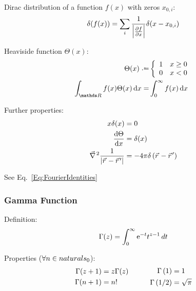 			\noindent
			Dirac distribution of a function $f(x)$ with zeros $x_{0,i}$:
			\begin{equation}
				\delta(f(x)) = \sum_i \frac{1}{\abs{\pdv{f}{x}(x_{0,i})}}\delta(x-x_{0,i})
			\end{equation}

			\noindent
			Heaviside function $\Theta(x)$:
			\begin{align}
				\Theta(x) \defeq & \left\{\begin{array}{ll}
					1 & x\ge 0 \\
					0 & x<0    \\
				\end{array}\right. \\
				\int_{\reals } f(x)\Theta(x)\dd{x} =& \int_{0}^{\infty} f(x)\dd{x}
			\end{align}

			\noindent
			Further properties:
			\begin{align}
				x \delta(x) &= 0\\
				\dv{\Theta}{x}(x) &= \delta(x) \\
				\Nabla^2\frac{1}{\abs{\vec{r} - \vec{r}'}} &= -4\pi\delta\left(\vec{r} - \vec{r}'\right)
			\end{align}

			\noindent
			See Eq.~\ref{Eq:FourierIdentities}

		\subsubsection{Gamma Function}
			\noindent
			Definition:
			\begin{equation}
				\Gamma(z)=\int_0^{\infty}\mathrm{e}^{-t}t^{z-1}\,dt
			\end{equation}

			\noindent
			Properties ($\forall n\in\\naturals _0$):
			\begin{equation}
				\begin{aligned}
					\Gamma(z+1)&=z\Gamma(z) \\
					\Gamma(n+1) &= n!
				\end{aligned}
				\hspace{30pt}
				\begin{aligned}
					\Gamma\left(1 \right)&=1 \\
					\Gamma\left(1/2 \right)&=\sqrt{\pi} \\
				\end{aligned}
			\end{equation}

